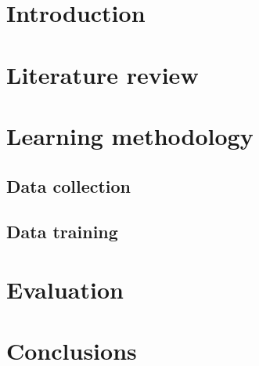 \documentclass[NewProceedings, InsideFigs]{ascelike} %
\begin{document}



\section{Introduction}%





\section{Literature review} \label{sec:litrev} %
%
\section{Learning methodology} \label{sec:proposed_method} %
%
\subsection{Data collection}
\subsection{Data training}
%
\section{Evaluation} \label{sec:val}

%
\section{Conclusions} \label{sec:conclns} 


%
%
\end{document}
